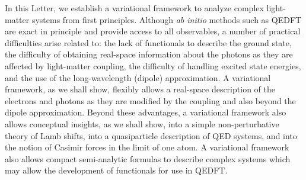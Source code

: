 \documentclass[aps,prl,twocolumn,
	groupedaddress,superscriptaddress,
	amsfonts,amssymb,amsmath,floatfix,
	citeautoscript]{revtex4-1}
\begin{document}
 In this Letter, we establish a variational framework to analyze complex light-matter systems from first principles. Although  \textit{ab initio} methods such as QEDFT are exact in principle and provide access to all observables, a number of practical difficulties arise related to: the lack of functionals to describe the ground state, the difficulty of obtaining real-space information about the photons as they are affected by light-matter coupling, the difficulty of handling excited state energies, and the use of the long-wavelength (dipole) approximation. A variational framework, as we shall show, flexibly allows a real-space description of the electrons and photons as they are modified by the coupling and also beyond the dipole approximation. Beyond these advantages, a variational framework also allows conceptual insights, as we shall show, into a simple non-perturbative theory of Lamb shifts, into a quasiparticle description of QED systems, and into the notion of Casimir forces in the limit of one atom. A variational framework also allows compact semi-analytic formulas to describe complex systems which may allow the development of functionals for use in QEDFT. 
\end{document}
